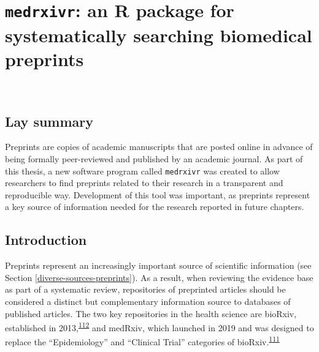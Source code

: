 \documentclass[a4paper, twoside]{templates/ociamthesis}
\begin{document}
\hypertarget{sys-rev-tools-heading}{%
\chapter{\texorpdfstring{\texttt{medrxivr}: an R package for systematically searching biomedical preprints}{medrxivr: an R package for systematically searching biomedical preprints}}\label{sys-rev-tools-heading}}

~

\minitoc 

\newpage

\begin{laybox}

\hypertarget{lay-summary-1}{%
\section*{Lay summary}\label{lay-summary-1}}

Preprints are copies of academic manuscripts that are posted online in advance of being formally peer-reviewed and published by an academic journal. As part of this thesis, a new software program called \texttt{medrxivr} was created to allow researchers to find preprints related to their research in a transparent and reproducible way. Development of this tool was important, as preprints represent a key source of information needed for the research reported in future chapters.

\end{laybox}

\hypertarget{sys-rev-tools-intro}{%
\section{Introduction}\label{sys-rev-tools-intro}}

Preprints represent an increasingly important source of scientific information (see Section \ref{diverse-sources-preprints}). As a result, when reviewing the evidence base as part of a systematic review, repositories of preprinted articles should be considered a distinct but complementary information source to databases of published articles. The two key repositories in the health science are bioRxiv, established in 2013,\textsuperscript{\protect\hyperlink{ref-sever2019}{112}} and medRxiv, which launched in 2019 and was designed to replace the ``Epidemiology'' and ``Clinical Trial'' categories of bioRxiv.\textsuperscript{\protect\hyperlink{ref-rawlinson2019}{111}}
\end{document}
